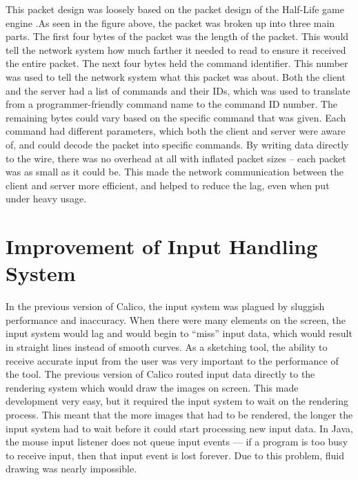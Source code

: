 This packet design was loosely based on the packet design of the Half-Life game engine \cite{rcon}.As seen in the figure above, the packet was broken up into three main parts. The first four bytes of the packet was the length of the packet. This would tell the network system how much farther it needed to read to ensure it received the entire packet. The next four bytes held the command identifier. This number was used to tell the network system what this packet was about. Both the client and the server had a list of commands and their IDs, which was used to translate from a programmer-friendly command name to the command ID number. The remaining bytes could vary based on the specific command that was given. Each command had different parameters, which both the client and server were aware of, and could decode the packet into specific commands. By writing data directly to the wire, there was no overhead at all with inflated packet sizes -- each packet was as small as it could be. This made the network communication between the client and server more efficient, and helped to reduce the lag, even when put under heavy usage.



\section{Improvement of Input Handling System}
In the previous version of Calico, the input system was plagued by sluggish performance and inaccuracy. When there were many elements on the screen, the input system would lag and would begin to ``miss'' input data, which would result in straight lines instead of smooth curves. As a sketching tool, the ability to receive accurate input from the user was very important to the performance of the tool. The previous version of Calico routed input data directly to the rendering system which would draw the images on screen. This made development very easy, but it required the input system to wait on the rendering process. This meant that the more images that had to be rendered, the longer the input system had to wait before it could start processing new input data. In Java, the mouse input listener does not queue input events --- if a program is too busy to receive input, then that input event is lost forever. Due to this problem, fluid drawing was nearly impossible.   

